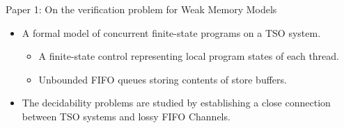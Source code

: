 \documentclass[9pt]{beamer}
\begin{document}
\begin{frame}{Paper 1: On the verification problem for Weak Memory Models}
\begin{itemize}
\item A formal model of concurrent finite-state programs on a TSO system.
	\begin{itemize}
	\item A finite-state control representing local program states of each thread.
  \item Unbounded FIFO queues storing contents of store buffers.
	\end{itemize}
\pause
\item The decidability problems are studied by establishing a close connection
      between TSO systems and lossy FIFO Channels.
\end{itemize}
\end{frame}
\end{document}
